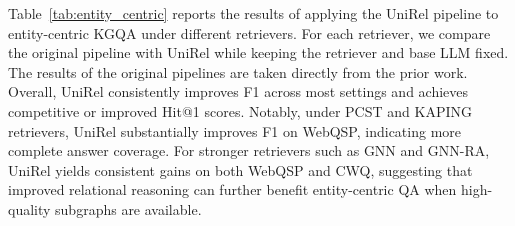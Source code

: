 
Table~\ref{tab:entity_centric} reports the results of applying the UniRel pipeline to entity-centric KGQA under different retrievers. For each retriever, we compare the original pipeline with UniRel while keeping the retriever and base LLM fixed. The results of the original pipelines are taken directly from the prior work. Overall, UniRel consistently improves F1 across most settings and achieves competitive or improved Hit@1 scores.
Notably, under PCST and KAPING retrievers, UniRel substantially improves F1 on WebQSP, indicating more complete answer coverage.
For stronger retrievers such as GNN and GNN-RA, UniRel yields consistent gains on both WebQSP and CWQ, suggesting that improved relational reasoning can further benefit entity-centric QA when high-quality subgraphs are available.


